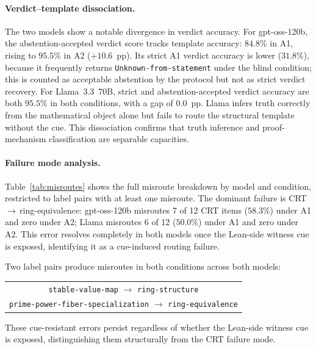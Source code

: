 \documentclass[11pt]{article}
\begin{document}
\paragraph{Verdict--template dissociation.}
The two models show a notable divergence in verdict accuracy.
For gpt-oss-120b, the abstention-accepted verdict score tracks template
accuracy: $84.8\%$ in A1, rising to $95.5\%$ in A2 ($+10.6$~pp). Its strict
A1 verdict accuracy is lower ($31.8\%$), because it frequently returns
\texttt{Unknown{-}from{-}statement} under the blind condition; this is counted
as acceptable abstention by the protocol but not as strict verdict recovery.
For Llama~3.3~70B, strict and abstention-accepted verdict accuracy are both
$95.5\%$ in both conditions, with a gap of $0.0$~pp.
Llama infers truth correctly from the mathematical object alone but fails to
route the structural template without the cue.
This dissociation confirms that truth inference and proof-mechanism
classification are separable capacities.

\paragraph{Failure mode analysis.}
Table~\ref{tab:misroutes} shows the full misroute breakdown by model and
condition, restricted to label pairs with at least one misroute.
The dominant failure is CRT\,$\to$\,ring-equivalence: gpt-oss-120b misroutes
7 of 12 CRT items ($58.3\%$) under A1 and zero under A2; Llama misroutes 6
of 12 ($50.0\%$) under A1 and zero under A2.
This error resolves completely in both models once the Lean-side witness cue is
exposed, identifying it as a cue-induced routing failure.

Two label pairs produce misroutes in both conditions across both models:
\begin{center}
\begin{tabular}{c}
\texttt{stable{-}value{-}map} $\to$ \texttt{ring{-}structure} \\
\texttt{prime{-}power{-}fiber{-}specialization} $\to$ \texttt{ring{-}equivalence}
\end{tabular}
\end{center}
These cue-resistant errors persist regardless of whether the
Lean-side witness cue is exposed, distinguishing them structurally
from the CRT failure mode.
\end{document}
